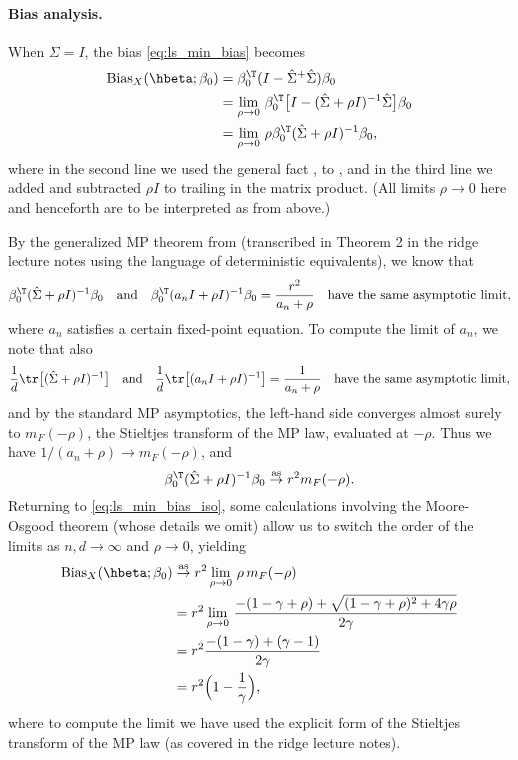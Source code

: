 \documentclass{article}
\begin{document}
\paragraph{Bias analysis.}

When $\Sigma = I$, the bias \eqref{eq:ls_min_bias} becomes 
\begin{align}
\nonumber
\Bias_X(\hbeta; \beta_0) 
&= \beta_0^\T (I - \hSigma^+ \hSigma) \beta_0 \\ 
\nonumber
&= \lim_{\rho \to 0} \, \beta_0^\T \big[ I - (\hSigma + \rho I)^{-1} \hSigma  
  \big] \beta_0 \\   
\label{eq:ls_min_bias_iso}
&= \lim_{\rho \to 0} \, \rho \beta_0^\T (\hSigma + \rho I)^{-1} \beta_0,  
\end{align}
where in the second line we used the general fact , to , and in the third line we added and subtracted $\rho I$ to
trailing \smash{$\hSigma$} in the matrix product. (All limits $\rho \to 0$ here  
and henceforth are to be interpreted as from above.) 

By the generalized MP theorem from \citet{rubio2011spectral} (transcribed in
Theorem 2 in the ridge lecture notes using the language of deterministic
equivalents), we know that  
\[
\beta_0^\T (\hSigma + \rho I)^{-1} \beta_0 \quad \text{and} \quad 
\beta_0^\T (a_n I + \rho I)^{-1} \beta_0 = \frac{r^2}{a_n + \rho} \quad
\text{have the same asymptotic limit},
\]
where $a_n$ satisfies a certain fixed-point equation. To compute the limit of
$a_n$, we note that also
\[
\frac{1}{d} \tr \big[ (\hSigma + \rho I)^{-1} \big] \quad \text{and} \quad  
\frac{1}{d} \tr \big[ (a_n I + \rho I)^{-1} \big] = \frac{1}{a_n + \rho}
\quad \text{have the same asymptotic limit},  
\]
and by the standard MP asymptotics, the left-hand side converges almost surely
to $m_F(-\rho)$, the Stieltjes transform of the MP law, evaluated at
$-\rho$. Thus we have $1/(a_n + \rho) \to m_F(-\rho)$, and    
\[
\beta_0^\T (\hSigma + \rho I)^{-1} \beta_0 \asto r^2 m_F(-\rho). 
\]
Returning to \eqref{eq:ls_min_bias_iso}, some calculations involving the
Moore-Osgood theorem (whose details we omit) allow us to switch the order of the
limits as $n,d \to \infty$ and $\rho \to 0$, yielding
\begin{align}
\nonumber
\Bias_X(\hbeta; \beta_0) &\asto r^2 \lim_{\rho \to 0} \, \rho \, m_F(-\rho) \\
\nonumber
&= r^2 \lim_{\rho \to 0} \, \frac{-(1 - \gamma + \rho) + \sqrt{(1 - \gamma +
  \rho)^2 + 4 \gamma \rho}}{2 \gamma} \\
\nonumber
&= r^2 \frac{-(1-\gamma) + (\gamma-1)}{2 \gamma} \\
\label{eq:ls_min_bias_iso_limit}
&= r^2 \Big( 1- \frac{1}{\gamma} \Big),
\end{align}
where to compute the limit we have used the explicit form of the Stieltjes
transform of the MP law (as covered in the ridge lecture notes).
\end{document}
